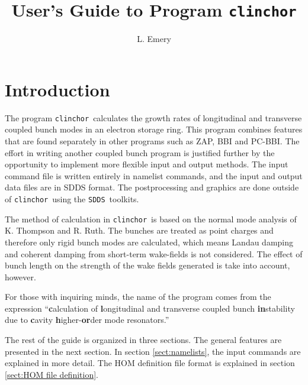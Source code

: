 \documentclass[11pt]{article}
\newcommand{\clinchor}{{\tt clinchor}}
\newcommand{\SDDS}{{\tt SDDS}}
\begin{document}
\title{User's Guide to Program \clinchor}
\author{L. Emery}
\maketitle
\section{Introduction}
The program \clinchor\ calculates the growth rates of longitudinal and
transverse coupled bunch modes in an electron storage ring.  This
program combines features that are found separately in other programs
such as ZAP\cite{ZAP}, BBI\cite{BBI} and PC-BBI\cite{PC-BBI}.  The
effort in writing another coupled bunch program is justified further
by the opportunity to implement more flexible input and output
methods. The input command file is written entirely in namelist
commands, and the input and output data files are in
SDDS format.  The postprocessing and graphics are
done outside of \clinchor\ using the \SDDS\ toolkits.

The method of calculation in \clinchor\ is based on the normal mode
analysis of K. Thompson and R. Ruth\cite{Thompson:PAC89}. 
The bunches are treated as point charges and therefore only rigid bunch
modes are calculated, which means Landau damping and coherent damping from
short-term wake-fields is not considered.
The effect of bunch length on the strength of the wake fields generated is
take into account, however.

For those with inquiring minds, the name of the program comes from the expression
``{\bf c}alculation of {\bf l}ongitudinal and transverse coupled bunch {\bf in}stability
due to {\bf c}avity {\bf h}igher-{\bf or}der mode resonators.''

The rest of the guide is organized in three sections. The general
features are presented in the next section.  In section
\ref{sect:namelists}, the input commands are explained in more detail.
The HOM definition file format is explained in section \ref{sect:HOM
file definition}.
\end{document}
